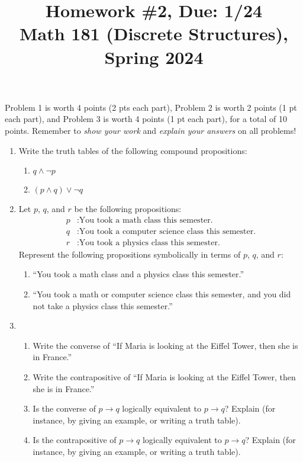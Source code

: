 \documentclass[11pt]{article}
\title{Homework \#2, Due: 1/24 \\Math 181 (Discrete Structures), Spring 2024}
\date{}
\begin{document}
\maketitle

\thispagestyle{empty}

\vspace{-1cm}

Problem 1 is worth 4 points (2 pts each part), Problem 2 is worth 2 points (1 pt each part), and Problem 3 is worth 4 points (1 pt each part), for a total of 10 points. Remember to \emph{show your work} and \emph{explain your answers} on all problems!

\begin{enumerate}
\item Write the truth tables of the following compound propositions:
\begin{enumerate}
\item $q \wedge \neg p$
\item $(p \wedge q) \vee \neg q$
\end{enumerate}

\item Let $p$, $q$, and $r$ be the following propositions:
\begin{align*}
p &: \textrm{You took a math class this semester.} \\
q &: \textrm{You took a computer science class this semester.} \\
r &: \textrm{You took a physics class this semester.}
\end{align*}
Represent the following propositions symbolically in terms of $p$, $q$, and $r$:
\begin{enumerate}
\item ``You took a math class and a physics class this semester.''
\item ``You took a math or computer science class this semester, and you did not take a physics class this semester.''
\end{enumerate}

\item \begin{enumerate}
\item Write the converse of ``If Maria is looking at the Eiffel Tower, then she is in France.''
\item Write the contrapositive of ``If Maria is looking at the Eiffel Tower, then she is in France.''
\item Is the converse of $p \to q$ logically equivalent to $p \to q$? Explain (for instance, by giving an example, or writing a truth table).
\item Is the contrapositive of $p \to q$ logically equivalent to $p \to q$? Explain (for instance, by giving an example, or writing a truth table).
\end{enumerate}
\end{enumerate}
\end{document}
